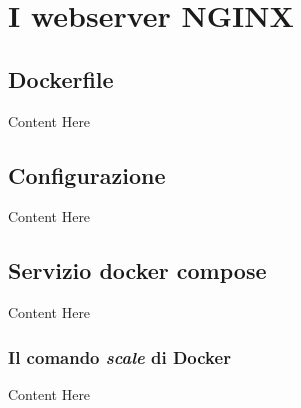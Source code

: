 \documentclass[../DocumentazioneProgetto.tex]{subfiles}
\begin{document}
	\section{I webserver NGINX} 
	\subsection{Dockerfile} 
	Content Here
	\subsection{Configurazione} 
	Content Here
\subsection{Servizio docker compose} 
Content Here
\subsubsection{Il comando \textit{scale} di Docker} 
Content Here
\end{document}
